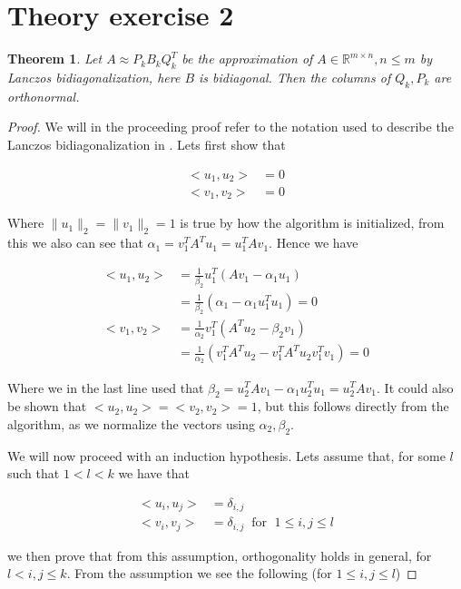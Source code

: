 \documentclass[11pt,a4paper,english]{elsarticle}%
\newtheorem{theorem}{Theorem}
\begin{document}
\section{Theory exercise 2}

\begin{theorem}
  Let $A \approx P_kB_kQ_k^T$ be the approximation of $A \in \mathbb{R}^{m \times n}, n \leq m$ by Lanczos bidiagonalization, here $B$ is bidiagonal. Then the columns of $Q_k,P_k$ are orthonormal.
\end{theorem}

\begin{proof}
  We will in the proceeding proof refer to the notation used to describe the Lanczos bidiagonalization in \cite{Lanczos}. Lets first show that

  \begin{align*}
    <u_1,u_2> &= 0 \\
    <v_1,v_2> &= 0
  \end{align*}

  \noindent Where $\|u_1\|_2 = \|v_1\|_2 = 1$ is true by how the algorithm is initialized, from this we also can see that $\alpha_1 = v_1^TA^Tu_1 = u_1^TAv_1$. Hence we have


  \begin{align*}
    <u_1,u_2> &= \frac{1}{\beta_2}u_1^T(Av_1 - \alpha_1 u_1) \\
    &= \frac{1}{\beta_2} (\alpha_1 - \alpha_1u_1^Tu_1) = 0
    \\
    <v_1,v_2> &= \frac{1}{\alpha_2}v_1^T(A^Tu_2 - \beta_2 v_1) \\
    &= \frac{1}{\alpha_2}(v_1^TA^Tu_2 - v_1^TA^Tu_2v_1^Tv_1) = 0
  \end{align*}

  \noindent Where we in the last line used that $\beta_2 = u_2^TAv_1 - \alpha_1u_2^Tu_1 = u_2^TAv_1$. It could also be shown that $<u_2,u_2> = <v_2,v_2> = 1$, but this follows directly from the algorithm, as we normalize the vectors using $\alpha_2,\beta_2$.

  We will now proceed with an induction hypothesis. Lets assume that, for some $l$ such that $1<l<k$ we have that

  \begin{align*}
    <u_i,u_{j}> &= \delta_{i,j} \\
    <v_i,v_{j}> &= \delta_{i,j} \; \; \text{for } \; 1 \leq i,j \leq l
  \end{align*}

  we then prove that from this assumption, orthogonality holds in general, for $l < i,j \leq k$. From the assumption we see the following (for $1 \leq i,j \leq l$)


\end{proof}
\end{document}
